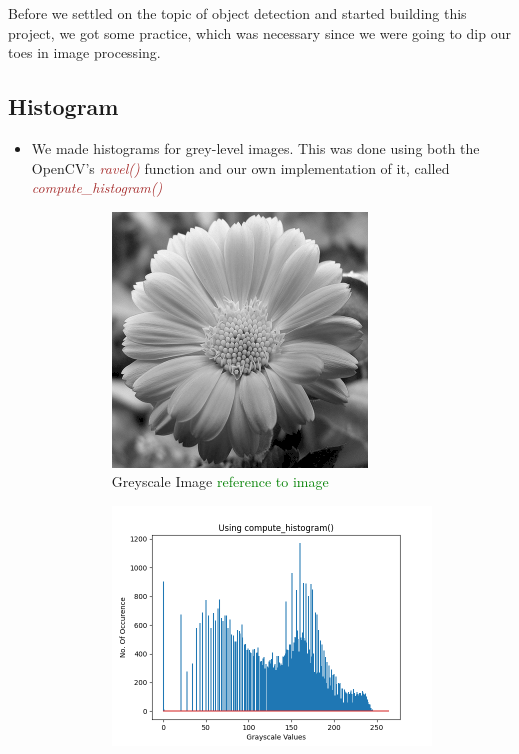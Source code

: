 \documentclass[a4paper]{article}
\begin{document}
Before we settled on the topic of object detection and started building this project, we got some practice, which was necessary since we were going to dip our toes in image processing.

\subsection{Histogram}

\begin{itemize}
    \item We made histograms for grey-level images. This was done using both the OpenCV's \textcolor{brown}{\textit{ravel()}} function and our own implementation of it, called \textcolor{brown}{\textit{compute\_histogram()}}
    \begin{figure}[h!]
        \centering
        \begin{subfigure}[b]{\linewidth}
            \centering
            \includegraphics[width=0.3\linewidth]{Pictures/histogram/greyscale.png}
            \caption{Greyscale Image \textcolor{green}{reference to image}}
        \end{subfigure}
        \begin{subfigure}[b]{0.4\linewidth}
            \centering
            \includegraphics[width=\linewidth]{Pictures/histogram/compute_histogram.png}

\end{subfigure}
\end{figure}
\end{itemize}
\end{document}
